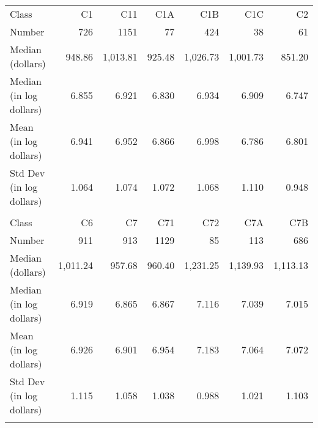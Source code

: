 \begin{tabular}{lrrrrrr}

     Class &        C1  &        C11 &        C1A &        C1B &        C1C &        C2  \\

    Number &        726 &       1151 &         77 &        424 &         38 &         61 \\

Median (dollars) &     948.86 &   1,013.81 &     925.48 &   1,026.73 &   1,001.73 &     851.20 \\

Median (in log dollars) &      6.855 &      6.921 &      6.830 &      6.934 &      6.909 &      6.747 \\

Mean (in log dollars) &      6.941 &      6.952 &      6.866 &      6.998 &      6.786 &      6.801 \\

Std Dev (in log dollars) &      1.064 &      1.074 &      1.072 &      1.068 &      1.110 &      0.948 \\

           &            &            &            &            &            &            \\

     Class &        C6  &        C7  &        C71 &        C72 &        C7A &        C7B \\

    Number &        911 &        913 &       1129 &         85 &        113 &        686 \\

Median (dollars) &   1,011.24 &     957.68 &     960.40 &   1,231.25 &   1,139.93 &   1,113.13 \\

Median (in log dollars) &      6.919 &      6.865 &      6.867 &      7.116 &      7.039 &      7.015 \\

Mean (in log dollars) &      6.926 &      6.901 &      6.954 &      7.183 &      7.064 &      7.072 \\

Std Dev (in log dollars) &      1.115 &      1.058 &      1.038 &      0.988 &      1.021 &      1.103 \\

           &            &            &            &            &            &            \\


\end{tabular}

